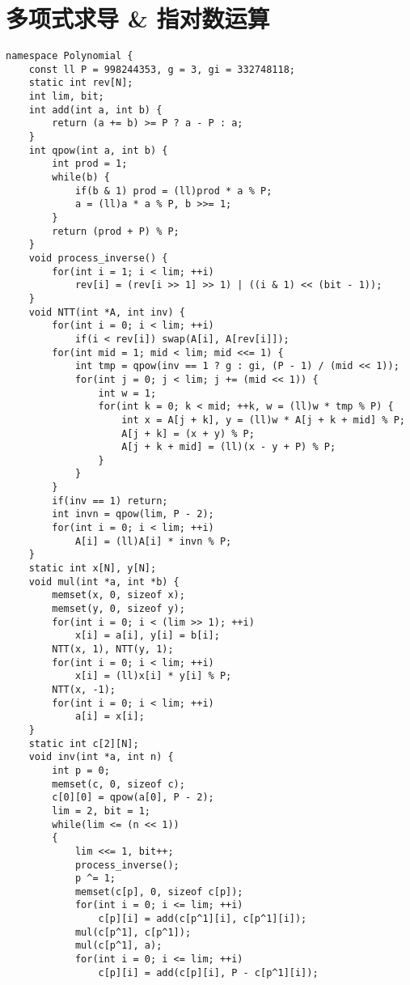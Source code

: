 \section{多项式求导 \& 指对数运算}
\begin{verbatim}
namespace Polynomial {  
    const ll P = 998244353, g = 3, gi = 332748118;  
    static int rev[N];  
    int lim, bit;  
    int add(int a, int b) {  
        return (a += b) >= P ? a - P : a;  
    }  
    int qpow(int a, int b) {  
        int prod = 1;  
        while(b) {  
            if(b & 1) prod = (ll)prod * a % P;  
            a = (ll)a * a % P, b >>= 1;  
        }
        return (prod + P) % P;  
    }  
    void process_inverse() {  
        for(int i = 1; i < lim; ++i)  
            rev[i] = (rev[i >> 1] >> 1) | ((i & 1) << (bit - 1));  
    }  
    void NTT(int *A, int inv) {  
        for(int i = 0; i < lim; ++i)  
            if(i < rev[i]) swap(A[i], A[rev[i]]);  
        for(int mid = 1; mid < lim; mid <<= 1) {  
            int tmp = qpow(inv == 1 ? g : gi, (P - 1) / (mid << 1));  
            for(int j = 0; j < lim; j += (mid << 1)) {  
                int w = 1;  
                for(int k = 0; k < mid; ++k, w = (ll)w * tmp % P) {  
                    int x = A[j + k], y = (ll)w * A[j + k + mid] % P;  
                    A[j + k] = (x + y) % P;  
                    A[j + k + mid] = (ll)(x - y + P) % P;  
                }  
            }  
        }  
        if(inv == 1) return;  
        int invn = qpow(lim, P - 2);  
        for(int i = 0; i < lim; ++i)  
            A[i] = (ll)A[i] * invn % P;  
    }
    static int x[N], y[N];  
    void mul(int *a, int *b) {  
        memset(x, 0, sizeof x);  
        memset(y, 0, sizeof y);  
        for(int i = 0; i < (lim >> 1); ++i)  
            x[i] = a[i], y[i] = b[i];  
        NTT(x, 1), NTT(y, 1);  
        for(int i = 0; i < lim; ++i)  
            x[i] = (ll)x[i] * y[i] % P;  
        NTT(x, -1);  
        for(int i = 0; i < lim; ++i)  
            a[i] = x[i];  
    }  
    static int c[2][N];  
    void inv(int *a, int n) {  
        int p = 0;  
        memset(c, 0, sizeof c);  
        c[0][0] = qpow(a[0], P - 2);  
        lim = 2, bit = 1;  
        while(lim <= (n << 1))  
        {  
            lim <<= 1, bit++;  
            process_inverse();  
            p ^= 1;  
            memset(c[p], 0, sizeof c[p]);  
            for(int i = 0; i <= lim; ++i)  
                c[p][i] = add(c[p^1][i], c[p^1][i]);  
            mul(c[p^1], c[p^1]);  
            mul(c[p^1], a);  
            for(int i = 0; i <= lim; ++i)  
                c[p][i] = add(c[p][i], P - c[p^1][i]);  

\end{verbatim}
